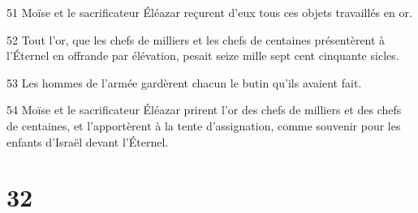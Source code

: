\par 51 Moïse et le sacrificateur Éléazar reçurent d'eux tous ces objets travaillés en or.
\par 52 Tout l'or, que les chefs de milliers et les chefs de centaines présentèrent à l'Éternel en offrande par élévation, pesait seize mille sept cent cinquante sicles.
\par 53 Les hommes de l'armée gardèrent chacun le butin qu'ils avaient fait.
\par 54 Moïse et le sacrificateur Éléazar prirent l'or des chefs de milliers et des chefs de centaines, et l'apportèrent à la tente d'assignation, comme souvenir pour les enfants d'Israël devant l'Éternel.

\chapter{32}

